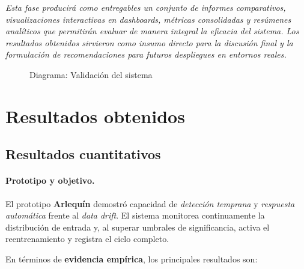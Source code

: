 \begin{enumerate}
    \textit{Esta fase producirá como entregables un conjunto de informes comparativos, visualizaciones interactivas en dashboards, métricas consolidadas y resúmenes analíticos que permitirán evaluar de manera integral la eficacia del sistema. Los resultados obtenidos sirvieron como insumo directo para la discusión final y la formulación de recomendaciones para futuros despliegues en entornos reales.}


    \begin{figure}[H]
    \centering
    \caption{Diagrama: Validación del sistema}
    \end{figure}
\end{enumerate}

\fi
\section{Resultados obtenidos}

\subsection{Resultados cuantitativos}

\paragraph{Prototipo y objetivo.}
El prototipo \textbf{Arlequín} demostró capacidad de \emph{detección temprana} y \emph{respuesta automática} frente al \textit{data drift}. El sistema monitorea continuamente la distribución de entrada y, al superar umbrales de significancia, activa el reentrenamiento y registra el ciclo completo.

En términos de \textbf{evidencia empírica}, los principales resultados son:
